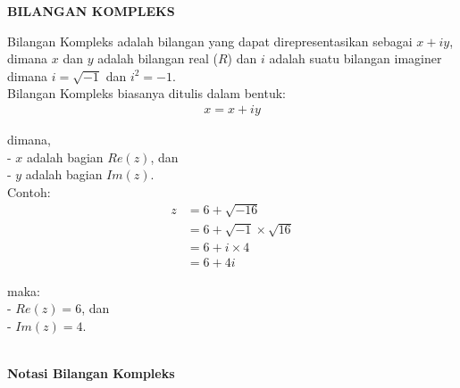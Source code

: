 \documentclass{article}
\begin{document}
    \begin{center}
        \textbf{BILANGAN KOMPLEKS}
    \end{center}

    Bilangan Kompleks adalah bilangan yang dapat direpresentasikan sebagai \( x + iy \), dimana $x$ dan $y$ adalah bilangan real ($R$) dan $i$ adalah suatu bilangan imaginer dimana \( i = \sqrt{-1} \) dan \( i^2 = -1 \).\\

    Bilangan Kompleks biasanya ditulis dalam bentuk:
    \begin{align}
        x = x + iy
    \end{align}

    \>dimana,\\
    - $x$ adalah bagian $Re(z)$, dan\\
    - $y$ adalah bagian $Im(z)$.\\

    Contoh:
    \begin{align}
        z & = 6 + \sqrt{-16} 
        \nonumber\\
        & = 6 + \sqrt{-1} \times \sqrt{16}
        \nonumber\\
        & = 6 + i \times 4
        \nonumber\\
        & = 6 + 4i
    \end{align}

    maka:\\
    -   $Re(z) = 6$, dan\\
    -   $Im(z) = 4$.\\\\

    \begin{center}
        \textbf{Notasi Bilangan Kompleks}
    \end{center}

    \\ \\ \\ \\
\end{document}
